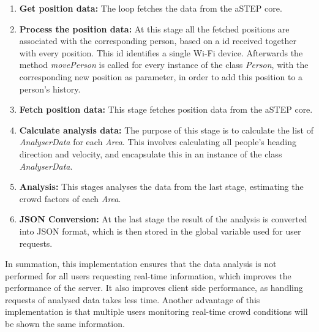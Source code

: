 \begin{enumerate}
	\item \textbf{Get position data:} The loop fetches the data from the aSTEP core.
    \item \textbf{Process the position data:} At this stage all the fetched positions are associated with the corresponding person, based on a id received together with every position. This id identifies a single Wi-Fi device. Afterwards the method \emph{movePerson} is called for every instance of the class \emph{Person}, with the corresponding new position as parameter, in order to add this position to a person's history.
    \item \textbf{Fetch position data:} This stage fetches position data from the aSTEP core.
    \item \textbf{Calculate analysis data:} The purpose of this stage is to calculate the list of \emph{AnalyserData} for each \emph{Area}. This involves calculating all people's heading direction and velocity, and encapsulate this in an instance of the class \emph{AnalyserData}.
    \item \textbf{Analysis:} This stages analyses the data from the last stage, estimating the crowd factors of each \emph{Area}.
    \item \textbf{JSON Conversion:} At the last stage the result of the analysis is converted into JSON format, which is then stored in the global variable used for user requests. 
\end{enumerate}

In summation, this implementation ensures that the data analysis is not performed for all users requesting real-time information, which improves the performance of the server. It also improves client side performance, as handling requests of analysed data takes less time. Another advantage of this implementation is that multiple users monitoring real-time crowd conditions will be shown the same information.